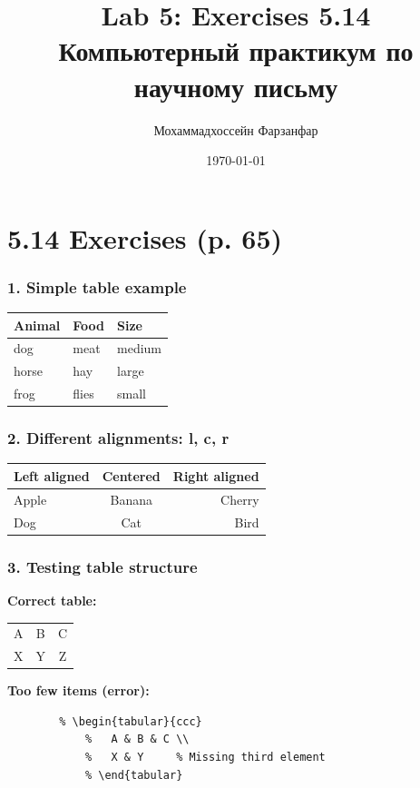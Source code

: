 \documentclass[12pt,a4paper]{article}
\title{\textbf{Lab 5: Exercises 5.14 }\\
	{\Large \selectlanguage{russian} Компьютерный практикум по научному письму}}
\author{\selectlanguage{russian} Мохаммадхоссейн Фарзанфар}
\date{\today}
\begin{document}
	
	\maketitle
	
	\section*{5.14 Exercises (p. 65)}
	
	\subsubsection*{1. Simple table example}
	\begin{center}
		\begin{tabular}{lll}
			\toprule
			Animal & Food & Size \\
			\midrule
			dog & meat & medium \\
			horse & hay & large \\
			frog & flies & small \\
			\bottomrule
		\end{tabular}
	\end{center}
	
	\subsubsection*{2. Different alignments: l, c, r}
	\begin{tabular}{l c r}
		\toprule
		Left aligned & Centered & Right aligned \\
		\midrule
		Apple & Banana & Cherry \\
		Dog & Cat & Bird \\
		\bottomrule
	\end{tabular}
	
	\subsubsection*{3. Testing table structure}
	\textbf{Correct table:}
	\begin{tabular}{ccc}
		A & B & C \\
		X & Y & Z \\
	\end{tabular}
	
	\textbf{Too few items (error):}
	\begin{verbatim}
		% \begin{tabular}{ccc}
			%   A & B & C \\
			%   X & Y     % Missing third element
			% \end{tabular}
	\end{verbatim}
	
\end{document}
